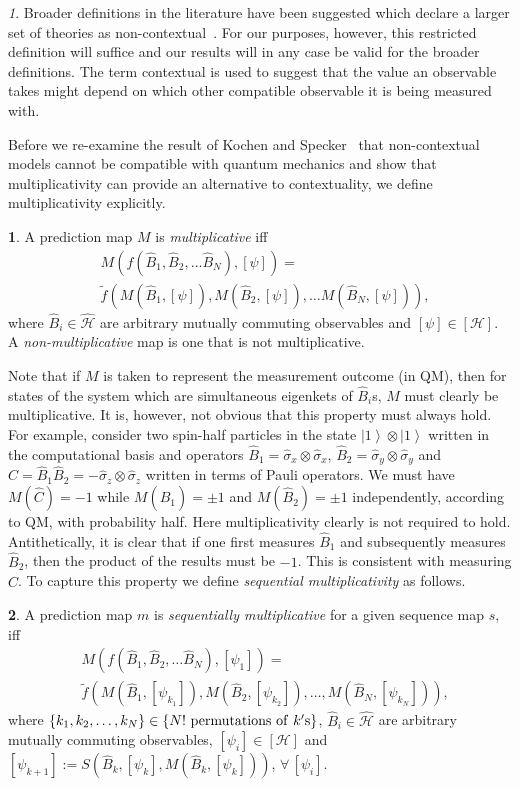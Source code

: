 \documentclass[british,aps,prl,superscriptaddress,nofootinbib,times,reprint]{revtex4-1}
\theoremstyle{plain}
\theoremstyle{plain}
\theoremstyle{definition}
\newtheorem{defn}{\protect\definitionname}
\theoremstyle{remark}
\theoremstyle{remark}
\newtheorem{defnrem}{\protect\remarkname}[defn]
\theoremstyle{remark}
\theoremstyle{plain}
\theoremstyle{plain}
\theoremstyle{plain}
\theoremstyle{definition}
\theoremstyle{definition}
\providecommand{\definitionname}{Definition}
\providecommand{\remarkname}{Remark}
\begin{document}
\begin{defnrem}
Broader definitions in the literature have been
suggested which declare a larger set of theories
as non-contextual~\cite{spekkens_pra}. For our
purposes, however, this restricted definition will
suffice  and our results will in any case be valid
for the broader definitions. The term contextual
is used to suggest that the value an observable
takes might depend on which other compatible
observable it is being  measured with.
\end{defnrem}
Before we re-examine the result of Kochen and
Specker~\cite{KochenSpecker} that non-contextual
models cannot be compatible with quantum
mechanics and show that multiplicativity can provide an
alternative to contextuality, we define
multiplicativity explicitly.
\begin{defn}
A prediction map $M$ is \emph{multiplicative} iff
\begin{align*} &
M(f(\hat{B}_{1},\hat{B}_{2},\dots\hat{B}_{N}),[\psi])
= \\ & \tilde
f(M(\hat{B}_{1},[\psi]),M(\hat{B}_{2},[\psi]),\dots
M(\hat{B}_{N},[\psi])), \end{align*}
where $\hat{B}_{i}\in\hat{\mathcal{H}}$ are
arbitrary mutually commuting observables and
$[\psi]\in[\mathcal{H}]$. A
\emph{non-multiplicative} map is one that is not
multiplicative.  
\end{defn} 
Note that if $M$ is taken to represent the
measurement outcome (in QM), then for states of
the system which are simultaneous eigenkets of
$\hat{B}_{i}$s, $M$ must clearly be
multiplicative. It is, however, not obvious that
this property must always hold. For example,
consider two spin-half particles in the state 
$\left|1\right\rangle \otimes\left|1\right\rangle
$ written in the computational basis and 
operators 
$\hat{B}_{1}=\hat{\sigma}_{x}\otimes\hat{\sigma}_{x}$,
$\hat{B}_{2}=\hat{\sigma}_{y}\otimes\hat{\sigma}_{y}$
and
$\hat{C}=\hat{B}_{1}\hat{B}_{2}=-\hat{\sigma}_{z}\otimes\hat{\sigma}_{z}$
written in terms of Pauli operators.
We must have $M(\hat{C})=-1$ while
$M(\hat{B}_{1})=\pm1$ and $M(\hat{B}_{2})=\pm1$
independently, according to QM, with probability
half. Here multiplicativity clearly is not
required to hold.
Antithetically, it is clear that if one first
measures $\hat{B}_{1}$ and subsequently measures
$\hat{B}_{2}$, then the product of the results
must be $-1$. This is consistent with measuring
$\hat{C}$. To capture this property we define
\emph{sequential multiplicativity} as follows.
\begin{defn} 
A prediction map $m$ is
\emph{sequentially multiplicative} for a given
sequence map $s$, iff \begin{align*}
&M(f(\hat{B}_{1},\hat{B}_{2},\dots\hat{B}_{N}),[\psi_{1}])=\\
&\tilde
f(M(\hat{B}_{1},[\psi_{k_{1}}]),M(\hat{B}_{2},[\psi_{k_{2}}]),\dots,M(\hat{B}_{N},[\psi_{k_{N}}])),
\end{align*} 
where
$\{k_{1},k_{2},\dots,k_{N}\} \in\{
N! {\rm ~permutations~of~}  k'{\rm s} \}$, 
$\hat{B}_{i}\in\hat{\mathcal{H}}$ are
arbitrary mutually commuting observables,
$[\psi_{i}]\in[\mathcal{H}]$ and
$[\psi_{k+1}] :=
S(\hat{B}_{k},[\psi_{k}],M(\hat{B}_{k},[\psi_{k}]))$,
$\forall\,[\psi_{i}]$.  
\label{defn:seqnMltpl}
\end{defn} 
\end{document}

